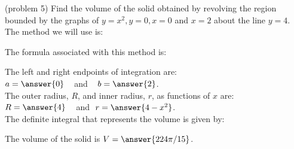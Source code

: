 \documentclass{ximera}
\begin{document}
\begin{problem}(problem 5)
Find the volume of the solid obtained by revolving the region bounded by the graphs of $y = x^2, y = 0, x = 0$ and $x = 2$ about the line $y = 4$.\\
The method we will use is:
\begin{multipleChoice}
\end{multipleChoice}

The formula associated with this method is:
\begin{multipleChoice}
\end{multipleChoice}

The left and right endpoints of integration are:\\
$a = \answer{0}\;\;\;$ and $\;\;\; b = \answer{2}$.\\
The outer radius, $R$, and inner radius, $r$, as functions of $x$ are:\\
$R = \answer{4} \;\;\;$ and $\; r = \answer{4-x^2}$.\\

The definite integral that represents the volume is given by:\\
\begin{multipleChoice}
\end{multipleChoice}

The volume of the solid is $V = \answer{224\pi/15}$.

\end{problem}
\end{document}
